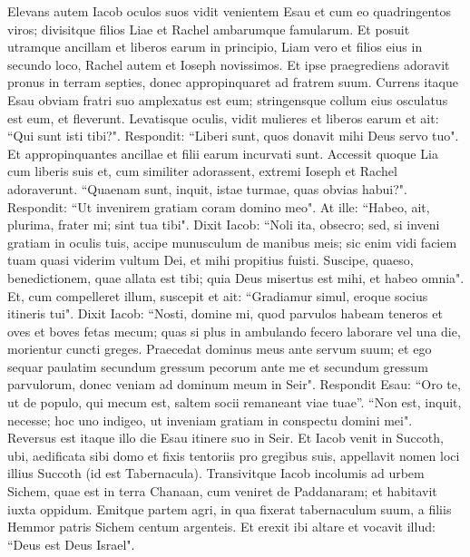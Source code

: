 \begin{biblechapter}  
\verse Elevans autem Iacob oculos suos vidit venientem Esau et cum eo quadringentos viros; divisitque filios Liae et Rachel ambarumque famularum.  
\verse Et posuit utramque ancillam et liberos earum in principio, Liam vero et filios eius in secundo loco, Rachel autem et Ioseph novissimos. 
\verse Et ipse praegrediens adoravit pronus in terram septies, donec appropinquaret ad fratrem suum. 
\verse Currens itaque Esau obviam fratri suo amplexatus est eum; stringensque collum eius osculatus est eum, et fleverunt. 
\verse Levatisque oculis, vidit mulieres et liberos earum et ait: “Qui sunt isti tibi?". Respondit: “Liberi sunt, quos donavit mihi Deus servo tuo". 
\verse Et appropinquantes ancillae et filii earum incurvati sunt. 
\verse Accessit quoque Lia cum liberis suis et, cum similiter adorassent, extremi Ioseph et Rachel adoraverunt. 
\verse “Quaenam sunt, inquit, istae turmae, quas obvias habui?". Respondit: “Ut invenirem gratiam coram domino meo". 
\verse At ille: “Habeo, ait, plurima, frater mi; sint tua tibi". 
\verse Dixit Iacob: “Noli ita, obsecro; sed, si inveni gratiam in oculis tuis, accipe munusculum de manibus meis; sic enim vidi faciem tuam quasi viderim vultum Dei, et mihi propitius fuisti. 
\verse Suscipe, quaeso, benedictionem, quae allata est tibi; quia Deus misertus est mihi, et habeo omnia". Et, cum compelleret illum, suscepit 
\verse et ait: “Gradiamur simul, eroque socius itineris tui". 
\verse Dixit Iacob: “Nosti, domine mi, quod parvulos habeam teneros et oves et boves fetas mecum; quas si plus in ambulando fecero laborare vel una die, morientur cuncti greges. 
\verse Praecedat dominus meus ante servum suum; et ego sequar paulatim secundum gressum pecorum ante me et secundum gressum parvulorum, donec veniam ad dominum meum in Seir". 
\verse Respondit Esau: “Oro te, ut de populo, qui mecum est, saltem socii remaneant viae tuae”. “Non est, inquit, necesse; hoc uno indigeo, ut inveniam gratiam in conspectu domini mei". 
\verse Reversus est itaque illo die Esau itinere suo in Seir. 
\verse Et Iacob venit in Succoth, ubi, aedificata sibi domo et fixis tentoriis pro gregibus suis, appellavit nomen loci illius Succoth (id est Tabernacula). 
\verse Transivitque Iacob incolumis ad urbem Sichem, quae est in terra Chanaan, cum veniret de Paddanaram; et habitavit iuxta oppidum. 
\verse Emitque partem agri, in qua fixerat tabernaculum suum, a filiis Hemmor patris Sichem centum argenteis. 
\verse Et erexit ibi altare et vocavit illud: “Deus est Deus Israel". 
\end{biblechapter}


